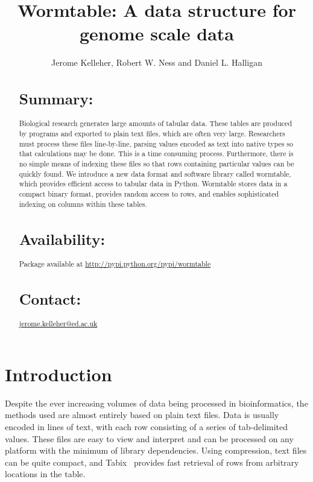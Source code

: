 \documentclass{bioinfo}
\begin{document}

\title[Wormtable]{Wormtable: A data structure for genome scale data}
\author[Kelleher \textit{et~al}]{Jerome Kelleher, Robert W. Ness 
and Daniel L. Halligan}
\address{
University of Edinburgh,
King's Buildings,
West Mains Road,
EH9 3JT,
UK
}



\maketitle

\begin{abstract}
\section{Summary:}
Biological research generates large amounts of tabular data.
These tables are produced by 
programs and exported to plain text files, which are often very large. 
Researchers must process these files 
line-by-line, parsing values encoded as text into native types so that 
calculations may be done. This is a time consuming process.
Furthermore, there is no simple means of indexing these files so that 
rows containing particular values can be quickly found. We introduce a new 
data format and software library called wormtable, which provides efficient 
access to tabular data in Python. Wormtable stores data in a compact
binary format, provides random access to rows, and enables sophisticated
indexing on columns within these tables. 
\section{Availability:}
Package available at 
\href{http://pypi.python.org/pypi/wormtable}{http://pypi.python.org/pypi/wormtable}

\section{Contact:} \href{jerome.kelleher@ed.ac.uk}{jerome.kelleher@ed.ac.uk}
\end{abstract}

\section{Introduction}
Despite the ever increasing volumes of data being processed in bioinformatics,
the methods used are almost entirely based on plain text files. Data is 
usually encoded in lines of text, with each row consisting of a series of tab-delimited 
values.
These files are easy to view and interpret and can be processed on 
any platform with the minimum of library dependencies. Using compression,
text files can be quite compact, and Tabix~\citep{li11} provides  
fast retrieval of rows from arbitrary locations in the table.
\end{document}
